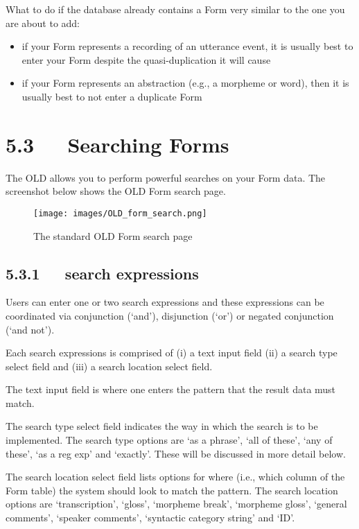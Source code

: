 \documentclass[letterpaper,10pt,english]{sphinxmanual}
\begin{document}
What to do if the database already contains a Form very similar to the one you
are about to add:
\begin{itemize}
\item {} 
if your Form represents a recording of an utterance event, it is usually best
to enter your Form despite the quasi-duplication it will cause

\item {} 
if your Form represents an abstraction (e.g., a morpheme or word), then it is
usually best to not enter a duplicate Form

\end{itemize}


\section{5.3   Searching Forms}
\label{user_guide:searching-forms}
The OLD allows you to perform powerful searches on your Form data.  The
screenshot below shows the OLD Form search page.
\begin{figure}[htbp]
\centering
\capstart

\texttt{[image: images/OLD\_form\_search.png]}
\caption{The standard OLD Form search page}\end{figure}


\subsection{5.3.1   search expressions}
\label{user_guide:search-expressions}
Users can enter one or two search expressions and these expressions can be
coordinated via conjunction (`and'), disjunction (`or') or negated conjunction
(`and not').

Each search expressions is comprised of (i) a text input field (ii) a search
type select field and (iii) a search location select field.

The text input field is where one enters the pattern that the result data must
match.

The search type select field indicates the way in which the search is to
be implemented.  The search type options are `as a phrase', `all of these',
`any of these', `as a reg exp' and `exactly'.  These will be discussed in more
detail below.

The search location select field lists options for where (i.e., which column of
the Form table) the system should look to match the pattern.  The search
location options are `transcription', `gloss', `morpheme break', `morpheme
gloss', `general comments', `speaker comments', `syntactic category string' and
`ID'.
\end{document}
